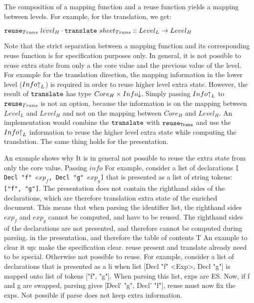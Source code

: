 The composition of a mapping function and a reuse function yields a mapping between levels. For example, for the translation, we get:

\begin{small}\begin{math}
{\tt reuse}_{Trans}~level_{H} \cdot {\tt translate}~sheet_{Trans} :: Level_{L} \rightarrow Level_{H}
\end{math}\end{small} 

Note that the strict separation between a mapping function and its corresponding reuse function is for specification purposes only. In general, it is not possible to reuse extra state from only a the core value and the previous value of the level. For example for the translation direction, the mapping information in the lower level ($Info\iup_{L}$) is required in order to reuse higher level extra state. However, the result of ${\tt translate}$ has type 
$Core_{H}\times Info\idwn$. Simply passing $Info\iup_{L}$ to ${\tt reuse}_{Trans}$ is not an option, because the information is on the mapping between $Level_{L}$ and $Level_{H}$ and not on the mapping between $Core_{H}$ and $Level_{H}$. An implementation would combine the ${\tt translate}$ with            ${\tt reuse_{Trans}}$ and use the $Info\iup_{L}$ information to reuse the higher level extra state while computing the translation. The same thing holds for the presentation.


\bc
 An example shows why It is in general not possible to reuse the extra state from only the core value. Passing $info$
For example, consider a list of declarations {\tt [ Decl "f" $exp_f$, Decl "g" $exp_g$]} that is presented as a list of string tokens: {\tt ["f", "g"]}. The presentation does not contain the righthand sides of the declarations, which are therefore translation extra state of the enriched document. This means that when parsing the identifier list, the righthand sides $exp_f$ and $exp_g$ cannot be computed, and have to be reused. 
The righthand sides of the declarations are not presented, and therefore cannot be computed during parsing. in the presentation, and therefore the table of contents T
An example to clear it up:
 make the specification clear. 
 reuse present and translate already need to be special. Otherwise not possible to reuse. For example, consider a list of declarations that is presented as a li when list [Decl "f" <Exp>, Decl "g"] is mapped onto list of tokens ["f", "g"]. When parsing this list, exps are ES. Now, if f and g are swapped, parsing gives [Decl' "g", Decl' "f"],  reuse must now fix the exps. Not possible if parse does not keep extra information.
\ec

